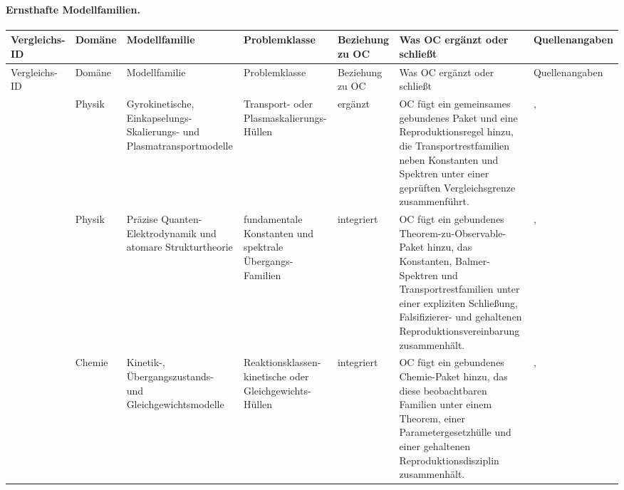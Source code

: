 \paragraph{Ernsthafte Modellfamilien.}
\begingroup
\scriptsize
\setlength{\emergencystretch}{1.5em}
\setlength{\tabcolsep}{2pt}
\setlength{\LTleft}{0pt}
\setlength{\LTright}{0pt}
\begin{longtable}{@{}L{0.14\textwidth}L{0.09\textwidth}L{0.14\textwidth}L{0.12\textwidth}L{0.10\textwidth}L{0.18\textwidth}L{0.15\textwidth}@{}}
\toprule
Vergleichs-ID & Domäne & Modellfamilie & Problemklasse & Beziehung zu OC & Was OC ergänzt oder schließt & Quellenangaben \\
\midrule
\endfirsthead
\toprule
Vergleichs-ID & Domäne & Modellfamilie & Problemklasse & Beziehung zu OC & Was OC ergänzt oder schließt & Quellenangaben \\
\midrule
\endhead
{} & Physik & Gyrokinetische, Einkapselungs-Skalierungs- und Plasmatransportmodelle & Transport- oder Plasmaskalierungs-Hüllen & ergänzt & OC fügt ein gemeinsames gebundenes Paket und eine Reproduktionsregel hinzu, die Transportrestfamilien neben Konstanten und Spektren unter einer geprüften Vergleichsgrenze zusammenführt. & , \allowbreak {} \\
 & Physik & Präzise Quanten-Elektrodynamik und atomare Strukturtheorie & fundamentale Konstanten und spektrale Übergangs-Familien & integriert & OC fügt ein gebundenes Theorem-zu-Observable-Paket hinzu, das Konstanten, Balmer-Spektren und Transportrestfamilien unter einer expliziten Schließung, Falsifizierer- und gehaltenen Reproduktionsvereinbarung zusammenhält. & , \allowbreak {} \\
 & Chemie & Kinetik-, Übergangszustands- und Gleichgewichtsmodelle & Reaktionsklassen-kinetische oder Gleichgewichts-Hüllen & integriert & OC fügt ein gebundenes Chemie-Paket hinzu, das diese beobachtbaren Familien unter einem Theorem, einer Parametergesetzhülle und einer gehaltenen Reproduktionsdisziplin zusammenhält. & , \allowbreak {} \\

\end{longtable}
